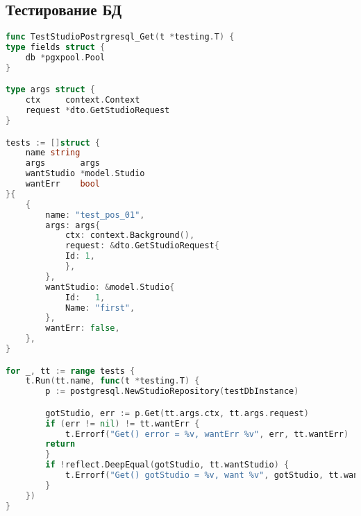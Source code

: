 \begin{appendices}
	\chapter{Тестирование БД}
	\begin{lstlisting}[language=go, label=lst:testing_code]
func TestStudioPostrgresql_Get(t *testing.T) {
type fields struct {
	db *pgxpool.Pool
}

type args struct {
	ctx     context.Context
	request *dto.GetStudioRequest
}

tests := []struct {
	name string
	args       args
	wantStudio *model.Studio
	wantErr    bool
}{
	{
		name: "test_pos_01",
		args: args{
			ctx: context.Background(),
			request: &dto.GetStudioRequest{
			Id: 1,
			},
		},
		wantStudio: &model.Studio{
			Id:   1,
			Name: "first",
		},
		wantErr: false,
	},
}

for _, tt := range tests {
	t.Run(tt.name, func(t *testing.T) {
		p := postgresql.NewStudioRepository(testDbInstance)

		gotStudio, err := p.Get(tt.args.ctx, tt.args.request)
		if (err != nil) != tt.wantErr {
			t.Errorf("Get() error = %v, wantErr %v", err, tt.wantErr)
		return
		}
		if !reflect.DeepEqual(gotStudio, tt.wantStudio) {
			t.Errorf("Get() gotStudio = %v, want %v", gotStudio, tt.wantStudio)
		}
	})
}
	\end{lstlisting}
\end{appendices}



